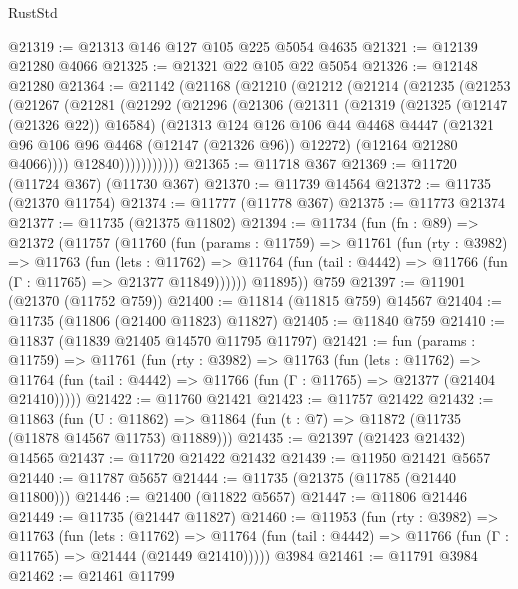 \begin{lexlean}{RustStd}
\begin{coremodule}
@21319 := @21313 @146 @127 @105 @225 @5054 @4635
@21321 := @12139 @21280 @4066
@21325 := @21321 @22 @105 @22 @5054
@21326 := @12148 @21280
@21364 := @21142
    (@21168
      (@21210
        (@21212
          (@21214
            (@21235
              (@21253
                (@21267
                  (@21281
                    (@21292
                      (@21296
                        (@21306
                          (@21311
                            (@21319
                              (@21325 (@12147 (@21326 @22)) @16584)
                              (@21313
                                @124
                                @126
                                @106
                                @44
                                @4468
                                @4447
                                (@21321 @96 @106 @96 @4468 (@12147 (@21326 @96)) @12272)
                                (@12164 @21280 @4066))))
                          @12840)))))))))))
@21365 := @11718 @367
@21369 := @11720 (@11724 @367) (@11730 @367)
@21370 := @11739 @14564
@21372 := @11735 (@21370 @11754)
@21374 := @11777 (@11778 @367)
@21375 := @11773 @21374
@21377 := @11735 (@21375 @11802)
@21394 := @11734
    (fun (fn : @89) =>
    @21372
      (@11757
        (@11760
          (fun (params : @11759) =>
          @11761
            (fun (rty : @3982) =>
            @11763
              (fun (lets : @11762) =>
              @11764 (fun (tail : @4442) => @11766 (fun (Γ : @11765) => @21377 @11849))))))
        @11895))
    @759
@21397 := @11901 (@21370 (@11752 @759))
@21400 := @11814 (@11815 @759) @14567
@21404 := @11735 (@11806 (@21400 @11823) @11827)
@21405 := @11840 @759
@21410 := @11837 (@11839 @21405 @14570 @11795 @11797)
@21421 := fun (params : @11759) =>
  @11761
    (fun (rty : @3982) =>
    @11763
      (fun (lets : @11762) =>
      @11764 (fun (tail : @4442) => @11766 (fun (Γ : @11765) => @21377 (@21404 @21410)))))
@21422 := @11760 @21421
@21423 := @11757 @21422
@21432 := @11863
    (fun (U : @11862) => @11864 (fun (t : @7) => @11872 (@11735 (@11878 @14567 @11753) @11889)))
@21435 := @21397 (@21423 @21432) @14565
@21437 := @11720 @21422 @21432
@21439 := @11950 @21421 @5657
@21440 := @11787 @5657
@21444 := @11735 (@21375 (@11785 (@21440 @11800)))
@21446 := @21400 (@11822 @5657)
@21447 := @11806 @21446
@21449 := @11735 (@21447 @11827)
@21460 := @11953
    (fun (rty : @3982) =>
    @11763
      (fun (lets : @11762) =>
      @11764 (fun (tail : @4442) => @11766 (fun (Γ : @11765) => @21444 (@21449 @21410)))))
    @3984
@21461 := @11791 @3984
@21462 := @21461 @11799

\end{coremodule}
\end{lexlean}
